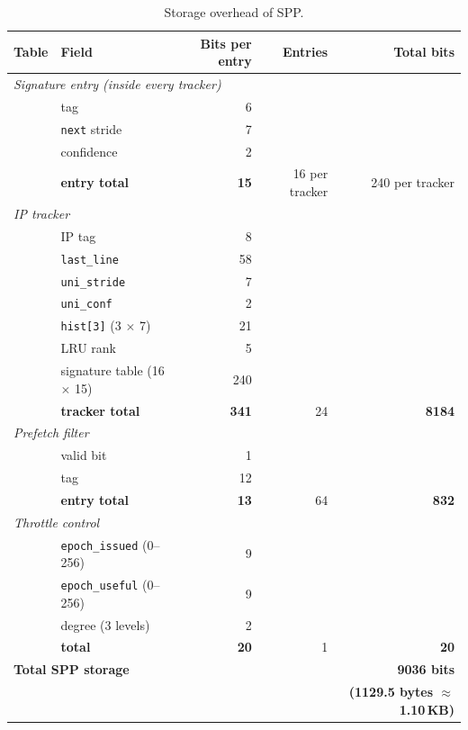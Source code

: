 \documentclass[11pt,a4paper]{article}
\begin{document}
\begin{table}[H]
    \centering
    \begin{tabular}{llrrr}
        \toprule
        Table & Field & Bits per entry & Entries & Total bits \\
        \midrule
        \multicolumn{5}{l}{\textit{Signature entry (inside every tracker)}} \\
        & tag                           & 6  &    &    \\
        & \texttt{next} stride          & 7  &    &    \\
        & confidence                    & 2  &    &    \\
        & \textbf{entry total}          & \textbf{15} & 16 per tracker & 240 per tracker \\
        \midrule
        \multicolumn{5}{l}{\textit{IP tracker}} \\
        & IP tag                        & 8  &    &    \\
        & \texttt{last\_line}           & 58 &    &    \\
        & \texttt{uni\_stride}          & 7  &    &    \\
        & \texttt{uni\_conf}            & 2  &    &    \\
        & \texttt{hist[3]} (3 $\times$ 7) & 21 &  &    \\
        & LRU rank                      & 5  &    &    \\
        & signature table (16 $\times$ 15) & 240 & & \\
        & \textbf{tracker total}        & \textbf{341} & 24 & \textbf{8184} \\
        \midrule
        \multicolumn{5}{l}{\textit{Prefetch filter}} \\
        & valid bit                     & 1  &    &    \\
        & tag                           & 12 &    &    \\
        & \textbf{entry total}          & \textbf{13} & 64 & \textbf{832} \\
        \midrule
        \multicolumn{5}{l}{\textit{Throttle control}} \\
        & \texttt{epoch\_issued} (0--256) & 9 &   &    \\
        & \texttt{epoch\_useful} (0--256) & 9 &   &    \\
        & degree (3 levels)             & 2  &    &    \\
        & \textbf{total}                & \textbf{20} & 1 & \textbf{20} \\
        \midrule
        \multicolumn{4}{l}{\textbf{Total SPP storage}} & \textbf{9036 bits} \\
        \multicolumn{4}{l}{} & \textbf{(1129.5 bytes $\approx$ 1.10\,KB)} \\
        \bottomrule
    \end{tabular}
    \caption{Storage overhead of SPP.}
    \label{tab:spp-storage}
\end{table}
\end{document}
